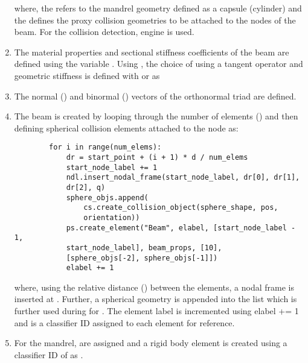 \begin{enumerate}
    where, the  refers to the mandrel geometry defined as a capsule (cylinder) and the  defines the proxy collision geometries to be attached to the nodes of the beam. For the collision detection,  engine is used.
    \item The material properties and sectional stiffness coefficients of the beam are defined using the variable . Using , the choice of using a tangent operator and geometric stiffness is defined with  or  as 
    \item The normal () and binormal () vectors of the orthonormal triad are defined.
    \item The beam is created by looping through the number of elements () and then defining spherical collision elements attached to the node as:
    \pythonstyle
    \begin{tcolorbox}\begin{lstlisting}
        for i in range(num_elems):
            dr = start_point + (i + 1) * d / num_elems
            start_node_label += 1
            ndl.insert_nodal_frame(start_node_label, dr[0], dr[1], 
            dr[2], q)
            sphere_objs.append(
                cs.create_collision_object(sphere_shape, pos, 
                orientation))
            ps.create_element("Beam", elabel, [start_node_label - 1,
            start_node_label], beam_props, [10], 
            [sphere_objs[-2], sphere_objs[-1]])
            elabel += 1
    \end{lstlisting}\end{tcolorbox}    
   where, using the relative distance () between the elements, a nodal frame is inserted at . Further, a spherical geometry is appended into the list  which is further used during  for . The element label  is incremented using elabel += 1 and \pythoninline{[10]} is a classifier ID assigned to each element for reference.
    \item For the mandrel,  are assigned and a rigid body element is created using a classifier ID of \pythoninline{[298]} as . 

\end{enumerate}
